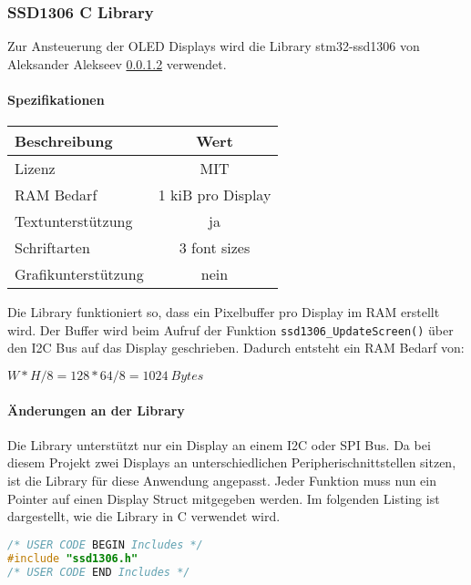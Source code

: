 \subsubsection{SSD1306 C Library}
\label{sec:Library_ssd1306}

Zur Ansteuerung der OLED Displays wird die Library stm32-ssd1306 von Aleksander Alekseev \ref{} verwendet.

\paragraph{Spezifikationen}

\begin{table}[H]
\begin{tabular}{|l|c|}
\hline
\textbf{Beschreibung} & \textbf{Wert}     \\ \hline
Lizenz                & MIT               \\ \hline
RAM Bedarf            & 1 kiB pro Display \\ \hline
Textunterstützung     & ja                \\ \hline
Schriftarten          & 3 font sizes      \\ \hline
Grafikunterstützung   & nein              \\ \hline
\end{tabular}
\end{table}

Die Library funktioniert so, dass ein Pixelbuffer pro Display im RAM erstellt wird.
Der Buffer wird beim Aufruf der Funktion \texttt{ssd1306\_UpdateScreen()} über den I2C Bus auf das Display geschrieben.
Dadurch entsteht ein RAM Bedarf von:

${W * H / 8 = 128 * 64 / 8 = 1024\ \si{Bytes}}$

\paragraph{Änderungen an der Library}

Die Library unterstützt nur ein Display an einem I2C oder SPI Bus. Da bei diesem Projekt zwei Displays an unterschiedlichen Peripherischnittstellen sitzen, ist die Library für diese Anwendung angepasst.
Jeder Funktion muss nun ein Pointer auf einen Display Struct mitgegeben werden.
Im folgenden Listing ist dargestellt, wie die Library in C verwendet wird.

\begin{lstlisting}[language=c]
/* USER CODE BEGIN Includes */
#include "ssd1306.h"
/* USER CODE END Includes */
\end{lstlisting}

